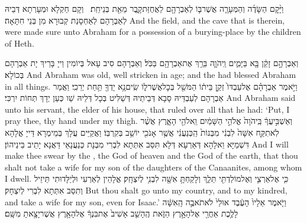 {וַיָּ֨קׇם הַשָּׂדֶ֜ה וְהַמְּעָרָ֧ה אֲשֶׁר\maqqaf בּ֛וֹ לְאַבְרָהָ֖ם לַאֲחֻזַּת\maqqaf קָ֑בֶר מֵאֵ֖ת בְּנֵי\maqqaf חֵֽת׃ \setuma }
{וְקָם חַקְלָא וּמְעָרְתָא דְּבֵיהּ לְאַבְרָהָם לְאַחְסָנַת קְבוּרָא מִן בְּנֵי חִתָּאָה׃}
{And the field, and the cave that is therein, were made sure unto Abraham for a possession of a burying-place by the children of Heth.}{}

\newperek
{}
{וְאַבְרָהָ֣ם זָקֵ֔ן בָּ֖א בַּיָּמִ֑ים וַֽיהֹוָ֛ה בֵּרַ֥ךְ אֶת\maqqaf אַבְרָהָ֖ם בַּכֹּֽל׃}
{וְאַבְרָהָם סִיב עָאל בְּיוֹמִין וַייָ בָּרֵיךְ יָת אַבְרָהָם בְּכוֹלָא׃}
{And Abraham was old, well stricken in age; and the \lord\space had blessed Abraham in all things.}{}
{וַיֹּ֣אמֶר אַבְרָהָ֗ם אֶל\maqqaf עַבְדּוֹ֙ זְקַ֣ן בֵּית֔וֹ הַמֹּשֵׁ֖ל בְּכׇל\maqqaf אֲשֶׁר\maqqaf ל֑וֹ שִֽׂים\maqqaf נָ֥א יָדְךָ֖ תַּ֥חַת יְרֵכִֽי׃}
{וַאֲמַר אַבְרָהָם לְעַבְדֵּיהּ סָבָא דְּבֵיתֵיהּ דְּשַׁלִּיט בְּכָל דְּלֵיהּ שַׁו כְּעַן יְדָךְ תְּחוֹת יִרְכִּי׃}
{And Abraham said unto his servant, the elder of his house, that ruled over all that he had: ‘Put, I pray thee, thy hand under my thigh.}{}
{וְאַשְׁבִּ֣יעֲךָ֔ בַּֽיהֹוָה֙ אֱלֹהֵ֣י הַשָּׁמַ֔יִם וֵֽאלֹהֵ֖י הָאָ֑רֶץ אֲשֶׁ֨ר לֹֽא\maqqaf תִקַּ֤ח אִשָּׁה֙ לִבְנִ֔י מִבְּנוֹת֙ הַֽכְּנַעֲנִ֔י אֲשֶׁ֥ר אָנֹכִ֖י יוֹשֵׁ֥ב בְּקִרְבּֽוֹ׃}
{וַאֲקַיֵּים עֲלָךְ בְּמֵימְרָא דַּייָ אֱלָהָא דִּשְׁמַיָּא וֵאלָהָא דְּאַרְעָא דְּלָא תִּסַּב אִתְּתָא לִבְרִי מִבְּנָת כְּנַעֲנָאֵי דַּאֲנָא יָתֵיב בֵּינֵיהוֹן׃}
{And I will make thee swear by the \lord, the God of heaven and the God of the earth, that thou shalt not take a wife for my son of the daughters of the Canaanites, among whom I dwell.}{}
{כִּ֧י אֶל\maqqaf אַרְצִ֛י וְאֶל\maqqaf מוֹלַדְתִּ֖י תֵּלֵ֑ךְ וְלָקַחְתָּ֥ אִשָּׁ֖ה לִבְנִ֥י לְיִצְחָֽק׃}
{אֱלָהֵין לְאַרְעִי וּלְיַלָּדוּתִי תֵּיזֵיל וְתִסַּב אִתְּתָא לִבְרִי לְיִצְחָק׃}
{But thou shalt go unto my country, and to my kindred, and take a wife for my son, even for Isaac.’}{}
{וַיֹּ֤אמֶר אֵלָיו֙ הָעֶ֔בֶד אוּלַי֙ לֹא\maqqaf תֹאבֶ֣ה הָֽאִשָּׁ֔ה לָלֶ֥כֶת אַחֲרַ֖י אֶל\maqqaf הָאָ֣רֶץ הַזֹּ֑את הֶֽהָשֵׁ֤ב אָשִׁיב֙ אֶת\maqqaf בִּנְךָ֔ אֶל\maqqaf הָאָ֖רֶץ אֲשֶׁר\maqqaf יָצָ֥אתָ מִשָּֽׁם׃}
